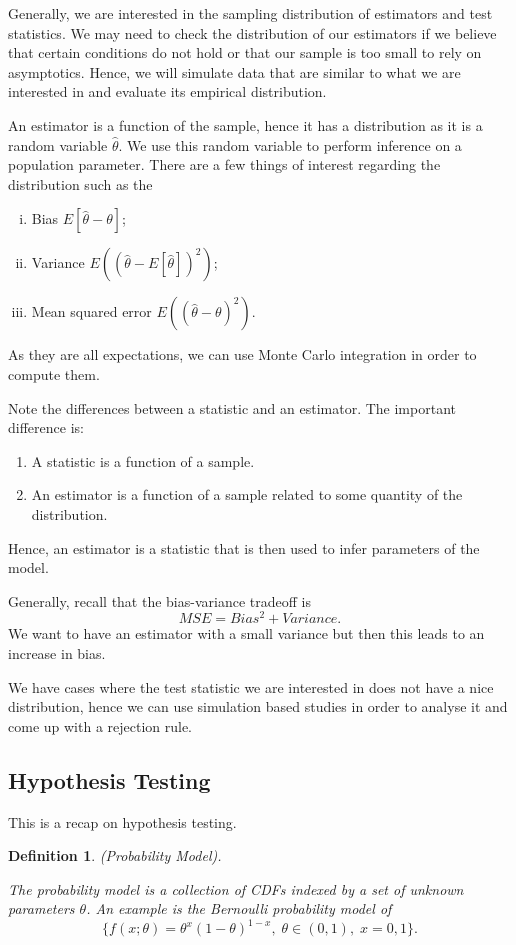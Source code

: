 \documentclass[twoside]{article}
\newtheorem{definition}[theorem]{Definition}
\begin{document}
Generally, we are interested in the sampling distribution of estimators and test statistics. We may need to check the distribution of our estimators if we believe that certain conditions do not hold or that our sample is too small to rely on asymptotics. Hence, we will simulate data that are similar to what we are interested in and evaluate its empirical distribution.


An estimator is a function of the sample, hence it has a distribution as it is a random variable $\hat{\theta}$. We use this random variable to perform inference on a population parameter. There are a few things of interest regarding the distribution such as the
\begin{enumerate}[(i)]
  \item Bias $E[\hat{\theta} - \theta]$;
  \item Variance $E\left((\hat{\theta} - E[\hat{\theta}])^2\right)$;
  \item Mean squared error $E\left((\hat{\theta} - \theta)^2\right)$.
\end{enumerate}

As they are all expectations, we can use Monte Carlo integration in order to compute them.

Note the differences between a statistic and an estimator. The important difference is:
\begin{enumerate}
\item A statistic is a function of a sample.
\item An estimator is a function of a sample related to some quantity of the distribution.
\end{enumerate}
Hence, an estimator is a statistic that is then used to infer parameters of the model.

Generally, recall that the bias-variance tradeoff is 
$$
MSE = Bias^2 + Variance.
$$
We want to have an estimator with a small variance but then this leads to an increase in bias. 

We have cases where the test statistic we are interested in does not have a nice distribution, hence we can use simulation based studies in order to analyse it and come up with a rejection rule.

\subsection{Hypothesis Testing}

This is a recap on hypothesis testing. 

\begin{definition}(Probability Model).

The probability model is a collection of CDFs indexed by a set of unknown parameters $\theta$. An example is the Bernoulli probability model of
$$
\{f(x;\theta) = \theta^x(1-\theta)^{1-x},\; \theta \in (0,1), \; x=0,1\}.
$$
\end{definition}
\end{document}

